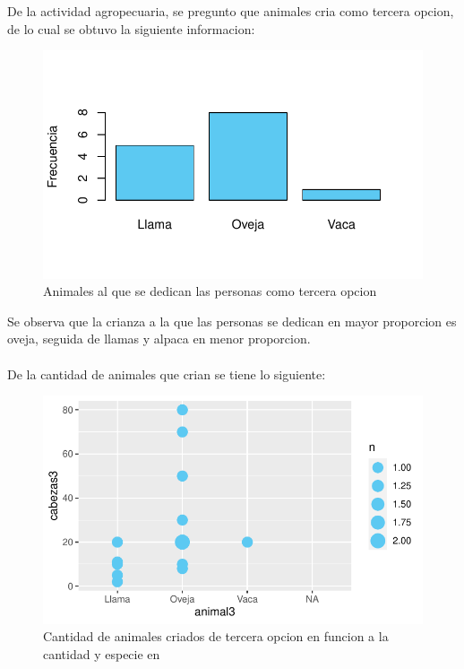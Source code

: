 \documentclass[12pt]{article}\usepackage[]{graphicx}\usepackage[]{xcolor}
\makeatletter
\def\maxwidth{ %
  \ifdim\Gin@nat@width>\linewidth
    \linewidth
  \else
    \Gin@nat@width
  \fi
}
\newenvironment{kframe}{%
 \def\at@end@of@kframe{}%
 \ifinner\ifhmode%
  \def\at@end@of@kframe{\end{minipage}}%
  \begin{minipage}{\columnwidth}%
 \fi\fi%
 \def\FrameCommand##1{\hskip\@totalleftmargin \hskip-\fboxsep
 \colorbox{shadecolor}{##1}\hskip-\fboxsep
     \hskip-\linewidth \hskip-\@totalleftmargin \hskip\columnwidth}%
 \MakeFramed {\advance\hsize-\width
   \@totalleftmargin\z@ \linewidth\hsize
   \@setminipage}}%
 {\par\unskip\endMakeFramed%
 \at@end@of@kframe}
\newenvironment{knitrout}{}{} %
\makeatother
\begin{document}
	
	De la actividad agropecuaria, se pregunto que animales cria como tercera opcion, de lo cual se obtuvo la siguiente informacion:
	\begin{figure}[H]
	\centering
\begin{knitrout}
\color{fgcolor}
\includegraphics[width=\maxwidth]{figure/twenty_one-1} 
\end{knitrout}
	\caption{Animales al que se dedican las personas como tercera opcion}
	\end{figure}
	Se observa que la crianza a la que las personas se dedican en mayor proporcion es oveja, seguida de llamas y alpaca en menor proporcion.\\
	\\
	De la cantidad de animales que crian se tiene lo siguiente:
	\begin{figure}[H]
	\centering
\begin{knitrout}
\color{fgcolor}\begin{kframe}


{\ttfamily\noindent\color{warningcolor}{\#\# Warning: Removed 19 rows containing non-finite values (`stat\_sum()`).}}\end{kframe}
\includegraphics[width=\maxwidth]{figure/twenty_two-1} 
\end{knitrout}
	\caption{Cantidad de animales criados de tercera opcion en funcion a la cantidad y especie en \comunidad}
	\end{figure}
\end{document}

